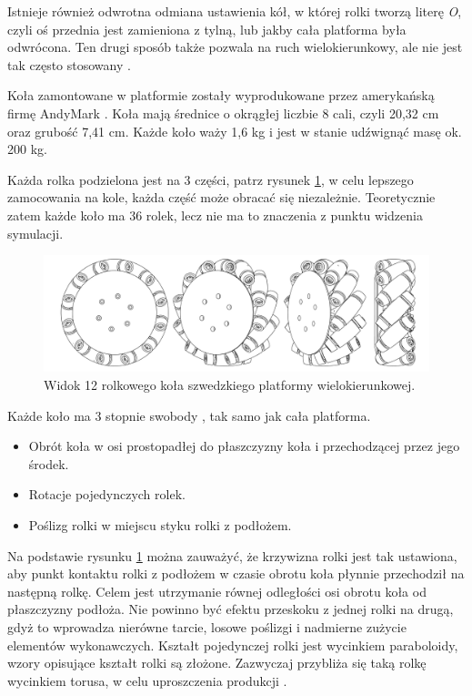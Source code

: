 	Istnieje również odwrotna odmiana ustawienia kół, w której rolki tworzą literę \emph{O}, 
	czyli oś przednia jest zamieniona z tylną, lub jakby cała platforma była odwrócona.
	Ten drugi sposób także pozwala na ruch wielokierunkowy, ale nie jest tak często stosowany \cite{paletobot}.
	
	Koła zamontowane w platformie zostały wyprodukowane przez amerykańską firmę AndyMark \cite{andymark}.
	Koła mają średnice o okrągłej liczbie 8 cali, czyli 20,32 cm oraz grubość 7,41 cm.
	Każde koło waży 1,6 kg i jest w stanie udźwignąć masę ok. 200 kg.
	
	Każda rolka podzielona jest na 3 części, patrz rysunek \ref{fig:wheel}, w celu lepszego zamocowania na kole, każda część może obracać się niezależnie.
	Teoretycznie zatem każde koło ma 36 rolek, lecz nie ma to znaczenia z punktu widzenia symulacji.

	\begin{figure}[H]
	\centering
	\includegraphics[width=\textwidth]{graphics/wheel.pdf}
	\caption{Widok 12 rolkowego koła szwedzkiego platformy wielokierunkowej.}
	\label{fig:wheel}
	\end{figure} 

	Każde koło ma 3 stopnie swobody \cite{kinematic_modeling}, tak samo jak cała platforma.
	\begin{itemize}
		\item Obrót koła w osi prostopadłej do płaszczyzny koła i przechodzącej przez jego środek.
		\item Rotacje pojedynczych rolek.
		\item Poślizg rolki w miejscu styku rolki z podłożem.
	\end{itemize}

	Na podstawie rysunku \ref{fig:wheel} można zauważyć, że krzywizna rolki jest tak ustawiona, aby punkt kontaktu rolki z podłożem w czasie obrotu koła płynnie przechodził na następną rolkę.
	Celem jest utrzymanie równej odległości osi obrotu koła od płaszczyzny podłoża.
	Nie powinno być efektu przeskoku z jednej rolki na drugą, gdyż to wprowadza nierówne tarcie, losowe poślizgi i nadmierne zużycie elementów wykonawczych.
	Kształt pojedynczej rolki jest wycinkiem paraboloidy, wzory opisujące kształt rolki są złożone.
	Zazwyczaj przybliża się taką rolkę wycinkiem torusa, w celu uproszczenia produkcji \cite{rollers}.

